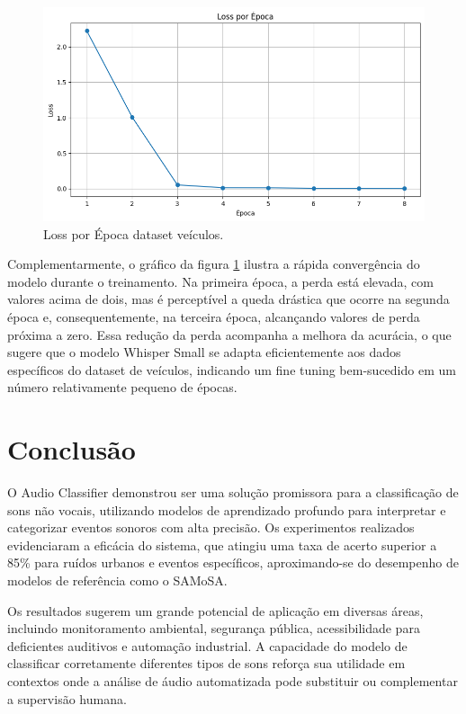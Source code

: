 \documentclass[conference]{IEEEtran}
\begin{document}
\begin{figure}[htbp]
\centerline{\includegraphics[width=\linewidth]{figures/figure5.png}}
\caption{Loss por Época dataset veículos.}
\label{fig5}
\end{figure}

Complementarmente, o gráfico da figura \ref{fig5} ilustra a rápida convergência do modelo durante o treinamento. Na primeira época, a perda está elevada, com valores acima de dois, mas é perceptível a queda drástica que ocorre na segunda época e, consequentemente, na terceira época, alcançando valores de perda próxima a zero. Essa redução da perda acompanha a melhora da acurácia, o que sugere que o modelo Whisper Small se adapta eficientemente aos dados específicos do dataset de veículos, indicando um fine tuning bem-sucedido em um número relativamente pequeno de épocas.

\section{Conclusão}
O Audio Classifier demonstrou ser uma solução promissora para a classificação de sons não vocais, utilizando modelos de aprendizado profundo para interpretar e categorizar eventos sonoros com alta precisão. Os experimentos realizados evidenciaram a eficácia do sistema, que atingiu uma taxa de acerto superior a 85\% para ruídos urbanos e eventos específicos, aproximando-se do desempenho de modelos de referência como o SAMoSA.

Os resultados sugerem um grande potencial de aplicação em diversas áreas, incluindo monitoramento ambiental, segurança pública, acessibilidade para deficientes auditivos e automação industrial. A capacidade do modelo de classificar corretamente diferentes tipos de sons reforça sua utilidade em contextos onde a análise de áudio automatizada pode substituir ou complementar a supervisão humana.
\end{document}
